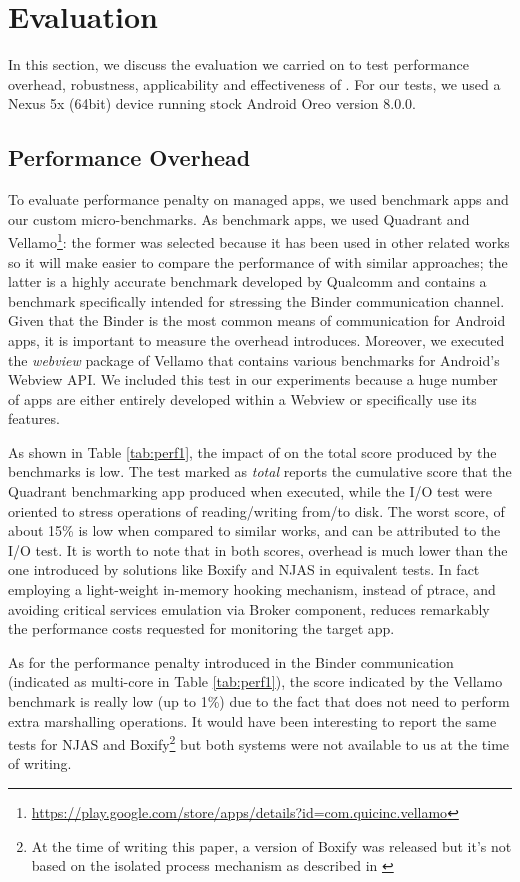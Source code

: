 \section{Evaluation}
In this section, we discuss the evaluation we carried on to test performance overhead, robustness, applicability and effectiveness of \asd. For our tests, we used a Nexus 5x (64bit) device running stock Android Oreo version 8.0.0.

\subsection{Performance Overhead}
To evaluate \asd performance penalty on managed apps, we used benchmark apps and our custom micro-benchmarks. As benchmark apps, we used Quadrant and  Vellamo\footnote{\url{https://play.google.com/store/apps/details?id=com.quicinc.vellamo}}: the former was selected because it has been used in other related works \cite{russello2013firedroid,backes2015boxify,bianchi2015njas} so it will make easier to compare the performance of \asd with similar approaches; the latter is a highly accurate benchmark developed by Qualcomm and contains a benchmark specifically intended for stressing the Binder communication channel. Given that the Binder is the most common means of communication for Android apps, it is important to measure the overhead \asd  introduces. Moreover, we executed the \textit{webview} package of Vellamo that contains various benchmarks for Android's Webview API. We included this test in our experiments because a huge number of apps are either entirely developed within a Webview or specifically use its features. 

As shown in Table \ref{tab:perf1}, the impact of \asd on the total score produced by the benchmarks is low. The test marked as \textit{total} reports the cumulative score that the Quadrant benchmarking app produced when executed, while the I/O test were oriented to stress operations of reading/writing from/to disk. The worst score, of about 15\% is low when compared to similar works, and can be  attributed to the I/O test. It is worth to note that in both scores, \asd overhead is much lower than the one introduced by solutions like Boxify and NJAS in equivalent tests. In fact employing a light-weight in-memory hooking mechanism, instead of ptrace, and 
avoiding critical services emulation via Broker component, \asd reduces remarkably the performance costs requested for monitoring the target app.

As for the performance penalty introduced in the Binder communication (indicated as multi-core in Table \ref{tab:perf1}), the score indicated by the Vellamo benchmark is really low (up to 1\%) due to the fact that \asd does not need to perform extra marshalling operations. It would have been interesting to report the same tests for  NJAS and Boxify\footnote{At the time of writing this paper, a version of Boxify was released but it's not based on the isolated process mechanism as described in \cite{backes2015boxify}} 
but both systems were not available to us at the time of writing. 

